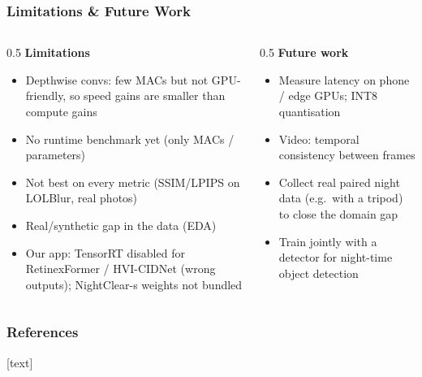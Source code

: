 \documentclass[
    11pt,%
    aspectratio=169,%
]{beamer}
\begin{document}
\begin{frame}
    \frametitle{Limitations \& Future Work}
    \begin{columns}[t]
        \begin{column}{0.5\textwidth}
            \footnotesize
            \textbf{Limitations}
            \begin{itemize}
                \item Depthwise convs: few MACs but not GPU-friendly, so speed gains are smaller than compute gains
                \item No runtime benchmark yet (only MACs / parameters)
                \item Not best on every metric (SSIM/LPIPS on LOLBlur, real photos)
                \item Real/synthetic gap in the data (EDA)
                \item Our app: TensorRT disabled for RetinexFormer / HVI-CIDNet (wrong outputs); NightClear-s weights not bundled
            \end{itemize}
        \end{column}
        \begin{column}{0.5\textwidth}
            \footnotesize
            \textbf{Future work}
            \begin{itemize}
                \item Measure latency on phone / edge GPUs; INT8 quantisation
                \item Video: temporal consistency between frames
                \item Collect real paired night data (e.g.\ with a tripod) to close the domain gap
                \item Train jointly with a detector for night-time object detection
            \end{itemize}
        \end{column}
    \end{columns}
\end{frame}

\begin{frame}
    \frametitle{References}
    \scriptsize
    [text]
    
    
\end{frame}
\end{document}
